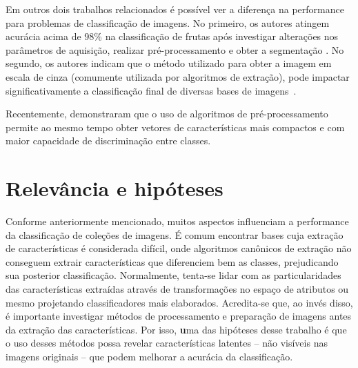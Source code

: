 Em outros dois trabalhos relacionados é possível ver a diferença na performance para problemas de classificação de imagens. No primeiro, os autores atingem acurácia acima de 98\% na classificação de frutas após investigar alterações nos parâmetros de aquisição, realizar pré-processamento e obter a segmentação \cite{Rocha2010}. No segundo, os autores indicam que o método utilizado para obter a imagem em escala de cinza (comumente utilizada por algoritmos de extração), pode impactar significativamente a classificação final de diversas bases de imagens~\cite{Kanan2012}.

Recentemente,  demonstraram que o uso de algoritmos de pré\hyp{}processamento permite ao mesmo tempo obter vetores de características mais compactos e com maior capacidade de discriminação entre classes.



\section{Relevância e hipóteses}

Conforme anteriormente mencionado, muitos aspectos influenciam a performance da classificação de coleções de imagens. É comum encontrar bases cuja extração de características é considerada difícil, onde algoritmos canônicos de extração não conseguem extrair características que diferenciem bem as classes, prejudicando sua posterior classificação. Normalmente, tenta-se lidar com as particularidades das características extraídas através de transformações no espaço de atributos ou mesmo projetando classificadores mais elaborados. Acredita-se que, ao invés disso, é importante investigar métodos de processamento e preparação de imagens antes da extração das características. Por isso, {\textbf uma das hipóteses desse trabalho é que o uso desses métodos possa revelar características latentes -- não visíveis nas imagens originais -- que podem melhorar a acurácia da classificação.}


